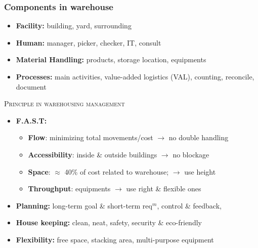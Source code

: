 \documentclass[10pt,handout,notes=show]{beamer}
\begin{document}
\begin{frame}
  \frametitle{Components in warehouse}

  \begin{itemize}
      \item \textbf{Facility:} building, yard, surrounding
      \item \textbf{Human:} manager, picker, checker, IT, consult
      \item \textbf{Material Handling:} products, \alert{storage location}, equipments
      \item \textbf{Processes:} \alert{main activities}, value-added logistics (VAL), counting, reconcile, document
  \end{itemize}

  \NextHalfLine
  \textsc{Principle in warehousing management}
    \begin{itemize}
      \item \textbf{F.A.S.T:}
      \begin{itemize}
        \item \textbf{Flow}: minimizing total movements/cost \alert<2->{ $\rightarrow$ no double handling}
        \item \textbf{Accessibility}: inside \& outside buildings \alert<2->{ $\rightarrow$ no blockage}
        \item \textbf{Space}: $\approx$ 40\% of cost related to warehouse; \alert<2->{ $\rightarrow$ use height}
        \item \textbf{Throughput}: equipments \alert<2->{ $\rightarrow$ use right \& flexible ones}
      \end{itemize}
      \item \textbf{Planning:} long-term goal \& short-term req$^m$, control \& feedback,
      \item \textbf{House keeping:} clean, neat, safety, security \& eco-friendly
      \item \textbf{Flexibility:} free space, stacking area, multi-purpose equipment
    \end{itemize}


\end{frame}
\end{document}
